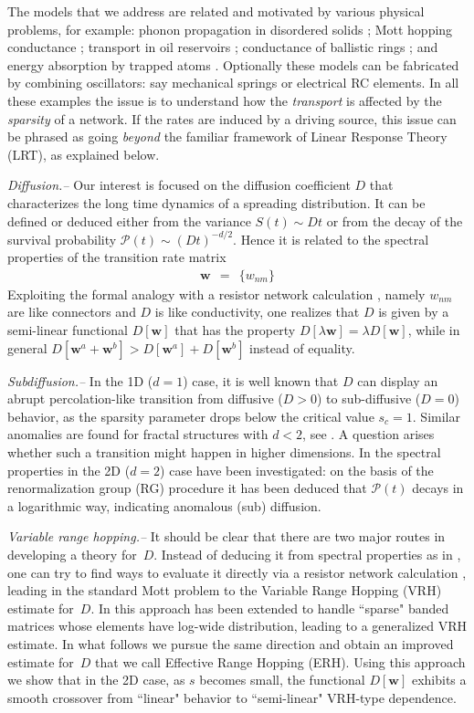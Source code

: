 \documentclass[onecolumn,fleqn,12pt,openany,draft]{book}
\newcommand{\beq}{\begin{eqnarray}}
\newcommand{\eeq}{\end{eqnarray}}
\begin{document}
The models that we address are related and motivated  
by various physical problems, for example: 
phonon propagation in disordered solids \cite{phn1,phn2,amir}; 
Mott hopping conductance \cite{mott,miller,AHL,Halp,pollak,VRHbook};
transport in oil reservoirs \cite{aa1,aa2};
conductance of ballistic rings \cite{kbd};
and energy absorption by trapped atoms \cite{kbw}. 
%
Optionally these models can be fabricated by combining oscillators: 
say mechanical springs or electrical RC elements. 
%   
In all these examples the issue is to understand how 
the {\em transport} is affected by the {\em sparsity} of a network.  
If the rates are induced by a driving source, this issue can be phrased as  
going {\em beyond} the familiar framework of Linear Response Theory (LRT), 
as explained below.  

{\em Diffusion.-- } 
Our interest is focused on the diffusion coefficient $D$ that characterizes the 
long time dynamics of a spreading distribution. It can be defined or deduced 
either from the variance ${S(t) \sim Dt}$ or from the decay of the 
survival probability ${\mathcal{P}(t) \sim (D t)^{-d/2}}$. Hence it is 
related to the spectral properties of the transition rate matrix 
%
\beq
\bm{w} \ \ = \ \ \{w_{nm}\}
\eeq
%
Exploiting the formal analogy with a resistor network calculation \cite{miller},  
namely $w_{nm}$ are like connectors and $D$ is like conductivity, 
one realizes that $D$ is given by a semi-linear functional $D[\bm{w}]$ 
that has the property ${D[\lambda \bm{w}] = \lambda D[\bm{w}]}$, 
while in general ${D[\bm{w}^a+\bm{w}^b] > D[\bm{w}^a]+D[\bm{w}^b]}$ instead of equality.      

{\em Subdiffusion.-- } 
In the 1D ($d{=}1$) case, it is well known \cite{alexander} that $D$ can display an abrupt 
percolation-like transition from diffusive (${D>0}$) to sub-diffusive (${D=0}$) 
behavior, as the sparsity parameter drops below the critical value ${s_c=1}$.
Similar anomalies are found for fractal structures with ${d<2}$, see \cite{granek,havlin}. 
A question arises whether such a transition might happen in higher dimensions.  
In \cite{amir} the spectral properties in the 2D ($d{=}2$) case 
have been investigated: on the basis of the renormalization group (RG) procedure 
it has been deduced that $\mathcal{P}(t)$ decays in a logarithmic way, 
indicating anomalous (sub) diffusion.  

{\em Variable range hopping.-- }
It should be clear that there are two major routes in developing  
a theory for~$D$. Instead of deducing it from spectral properties 
as in \cite{amir}, one can try to find ways to evaluate it directly 
via a resistor network calculation \cite{miller,AHL,Halp,pollak,VRHbook}, 
leading in the standard Mott problem to the Variable Range Hopping (VRH)
estimate for~$D$.   
%
In \cite{kbd,kbw,slk} this approach has been extended 
to handle ``sparse" banded matrices whose elements have log-wide distribution, 
leading to a generalized VRH estimate. 
In what follows we pursue the same direction and obtain an 
improved estimate for~$D$ that we call Effective Range Hopping (ERH).
Using this approach we show that in the 2D case, as $s$ becomes small, 
the functional $D[\bm{w}]$ exhibits a smooth crossover from ``linear" behavior  
to ``semi-linear" VRH-type dependence.  
\end{document}
